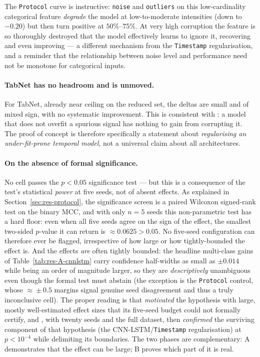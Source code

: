 \documentclass[../main.tex]{subfiles}
\begin{document}
The \texttt{Protocol} curve is instructive: \texttt{noise} and \texttt{outliers} on this low-cardinality categorical feature \emph{degrade} the model at low-to-moderate intensities (down to $-0.20$) but then turn positive at $50\%$--$75\%$. At very high corruption the feature is so thoroughly destroyed that the model effectively learns to ignore it, recovering and even improving --- a different mechanism from the \texttt{Timestamp} regularisation, and a reminder that the relationship between noise level and performance need not be monotone for categorical inputs.

\paragraph{TabNet has no headroom and is unmoved.}
For TabNet, already near ceiling on the reduced set, the deltas are small and of mixed sign, with no systematic improvement. This is consistent with : a model that does not overfit a spurious signal has nothing to gain from corrupting it. The proof of concept is therefore specifically a statement about \emph{regularising an under-fit-prone temporal model}, not a universal claim about all architectures.

\paragraph{On the absence of formal significance.}
No  cell passes the $p < 0.05$ significance test --- but this is a consequence of the test's statistical \emph{power} at five seeds, not of absent effects. As explained in Section~\ref{sec:res-protocol}, the significance screen is a paired Wilcoxon signed-rank test on the binary MCC, and with only $n = 5$ seeds this non-parametric test has a hard floor: even when all five seeds agree on the sign of the effect, the smallest two-sided $p$-value it can return is $\approx 0.0625 > 0.05$. No five-seed configuration can therefore ever be flagged, irrespective of how large or how tightly-bounded the effect is. And the effects \emph{are} often tightly bounded: the headline multi-class gains of Table~\ref{tab:res-A-cnnlstm} carry confidence half-widths as small as $\pm 0.014$ while being an order of magnitude larger, so they are \emph{descriptively} unambiguous even though the formal test must abstain (the exception is the \texttt{Protocol} control, whose $\approx\!\pm 0.5$ margins signal genuine seed disagreement and thus a truly inconclusive cell). The proper reading is that  \emph{motivated} the hypothesis with large, mostly well-estimated effect sizes that its five-seed budget could not formally certify, and , with twenty seeds and the full dataset, then \emph{confirmed} the surviving component of that hypothesis (the CNN-LSTM/\texttt{Timestamp} regularisation) at $p < 10^{-4}$ while delimiting its boundaries. The two phases are complementary: A demonstrates that the effect can be large; B proves which part of it is real.
\end{document}
